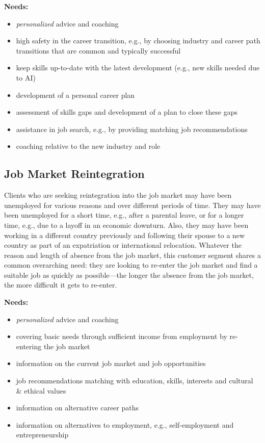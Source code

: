 \noindent\textbf{Needs:}
\begin{itemize}
    \item \textit{personalized} advice and coaching
    \item high safety in the career transition, e.g., by choosing industry and career path transitions that are common
        and typically successful
    \item keep skills up-to-date with the latest development (e.g., new skills needed due to AI)
    \item development of a personal career plan
    \item assessment of skills gaps and development of a plan to close these gaps
    \item assistance in job search, e.g., by providing matching job recommendations
    \item coaching relative to the new industry and role
\end{itemize}
\vspace*{0.1cm} 

\subsection{Job Market Reintegration}

Clients who are seeking reintegration into the job market may have been unemployed for various reasons and over
different periods of time. They may have been unemployed for a short time, e.g., after a parental leave, or for
a longer time, e.g., due to a layoff in an economic downturn. Also, they may have been working in a different
country previously and following their spouse to a new country as part of an expatriation or international
relocation. Whatever the reason and length of absence from the job market, this customer segment shares a
common overarching need: they are looking to re-enter the job market and find a suitable job as quickly as
possible---the longer the absence from the job market, the more difficult it gets to re-enter.
\newline

\noindent\textbf{Needs:}
\begin{itemize}
    \item \textit{personalized} advice and coaching
    \item covering basic needs through sufficient income from employment by re-entering the job market
    \item information on the current job market and job opportunities
    \item job recommendations matching with education, skills, interests and cultural \& ethical values
    \item information on alternative career paths
    \item information on alternatives to employment, e.g., self-employment and entrepreneurship
\end{itemize}

